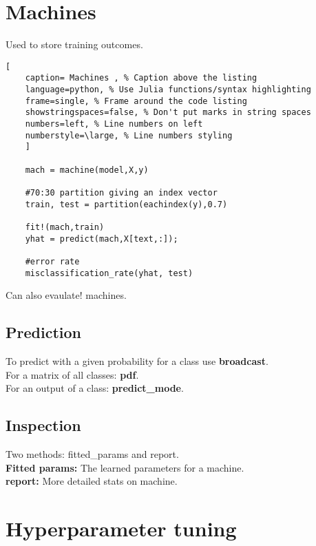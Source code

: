 \documentclass[11pt]{scrartcl} %
\begin{document}
\newpage

\section{Machines}

Used to store training outcomes.

\begin{lstlisting}[
	caption= Machines , % Caption above the listing
	language=python, % Use Julia functions/syntax highlighting
	frame=single, % Frame around the code listing
	showstringspaces=false, % Don't put marks in string spaces
	numbers=left, % Line numbers on left
	numberstyle=\large, % Line numbers styling
	]

	mach = machine(model,X,y)
	
	#70:30 partition giving an index vector
	train, test = partition(eachindex(y),0.7)

	fit!(mach,train)
	yhat = predict(mach,X[text,:]);

	#error rate
	misclassification_rate(yhat, test)

\end{lstlisting}

Can also evaulate! machines.

\subsection{Prediction}

To predict with a given probability for a class use \textbf{broadcast}.\\

For a matrix of all classes: \textbf{pdf}.\\

For an output of a class: \textbf{predict\_mode}.

\subsection{Inspection}

Two methods: fitted\_params and report.\\

\textbf{Fitted params:} The learned parameters for a machine.\\

\textbf{report:} More detailed stats on machine.

\section{Hyperparameter tuning}
\end{document}
